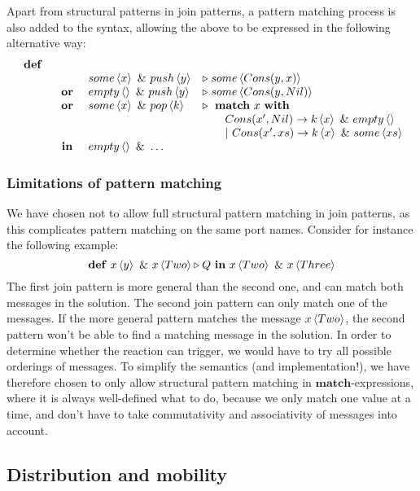 Apart from structural patterns in join patterns, a pattern matching process is
also added to the syntax, allowing the above to be expressed in the following
alternative way:
\begin{displaymath}
\begin{array}{rcll}
\defJ
\\ & &  \atm some<x> \andJ \atm push<y>&\toJ{} \atm some<Cons(y,x)>
\\ &\orJ&\atm empty<> \andJ \atm push<y> &\toJ{} \atm some<Cons(y,Nil)>
\\ &\orJ&\atm some<x> \andJ \atm pop<k> &\toJ{}  \match x \with
\\ &&& \qquad         Cons(x',Nil) \to \atm k<x> \andJ \atm empty<>
\\ &&& \qquad    |~ Cons(x',xs) \to \atm k<x> \andJ \atm some<xs>
\\&\inJ& \atm empty<> \andJ \ldots
\end{array}
\end{displaymath}

\subsubsection{Limitations of pattern matching}

We have chosen not to allow full structural pattern matching in join patterns,
as this complicates pattern matching on the same port names. Consider for
instance the following example:
\begin{equation*}
 \mathbf{def}~ \atm x<y>~\&~ \atm x<Two> \triangleright Q~
 \mathbf{in}~\atm x<Two>~\&~\atm x<Three>
\end{equation*}
The first join pattern is more general than the second one, and can match both
messages in the solution. The second join pattern can only match one of the
messages. If the more general pattern matches the message $\atm x<Two>$, the
second pattern won't be able to find a matching message in the solution. In
order to determine whether the reaction can trigger, we would have to try all
possible orderings of messages. To simplify the semantics (and implementation!),
we have therefore chosen to only allow structural pattern matching in
$\mathbf{match}$-expressions, where it is always well-defined what to do,
because we only match one value at a time, and don't have to take commutativity
and associativity of messages into account.


\subsection{Distribution and mobility}

